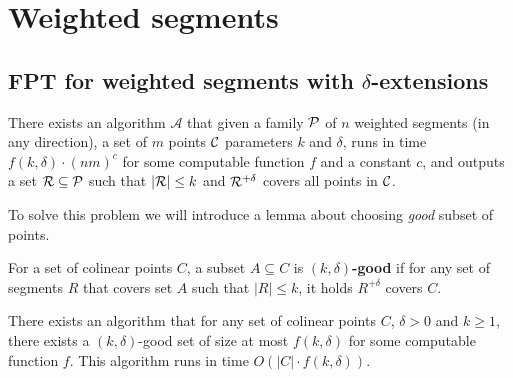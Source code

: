 \section{Weighted segments}
\subsection{FPT for weighted segments with $\delta$-extensions}
\begin{tw}{
	\label{fpt_weighted_segment}
	There exists an algorithm $\mathcal{A}$ that given a family $\mathcal{P}$ of
	$n$ weighted segments (in any direction),
	a set of $m$ points $\mathcal{C}$
	parameters $k$ and $\delta$,
	runs in time $f(k, \delta) \cdot (nm)^c$ for some computable function $f$ and a constant $c$,
	and outputs a set $\mathcal{R} \subseteq \mathcal{P}$
	such that $|\mathcal{R}| \le k$ and $\mathcal{R}^{+\delta}$ covers all points in $\mathcal{C}$.
}\end{tw}


To solve this problem we will introduce a lemma about choosing
\textit{good} subset of points.

\begin{defi}
	For a set of colinear points $C$,
	a subset $A \subseteq C$ is \textbf{$(k,\delta)$-good} 
	if for any set of segments $R$ that covers set $A$
	such that $|R| \le k$, it holds $R^{+\delta}$ covers $C$.
\end{defi}

\begin{lemma}
	\label{good_set_exists}
	There exists an algorithm that
	for any set of colinear points $C$, $\delta > 0$ and $k \ge 1$,
	there exists a $(k,\delta)$-good set of size at most $f(k, \delta)$
	for some computable function $f$. This algorithm runs in time
	$O(|C| \cdot f(k, \delta))$.
\end{lemma}

